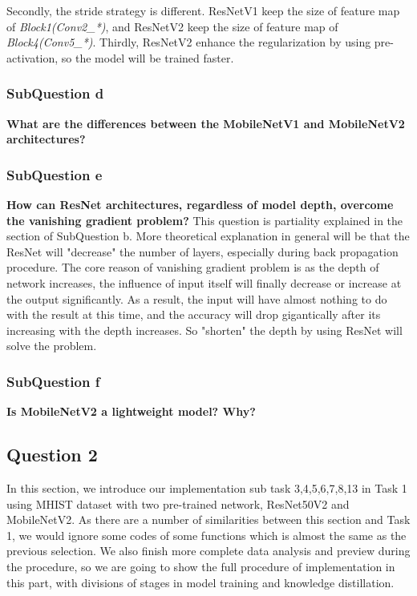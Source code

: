 \documentclass[conference]{IEEEtran}
\begin{document}
Secondly, the stride strategy is different. ResNetV1 keep the size of feature map of \textit{Block1(Conv2_*)}, and ResNetV2 keep the size of feature map of \textit{Block4(Conv5_*)}. Thirdly, ResNetV2 enhance the regularization by using pre-activation, so the model will be trained faster.

\subsubsection{SubQuestion d} \textbf{What are the differences between the MobileNetV1 and MobileNetV2 architectures?}

\subsubsection{SubQuestion e} \textbf{How can ResNet architectures, regardless of model depth, overcome the vanishing gradient problem?}
This question is partiality explained in the section of SubQuestion b. More theoretical explanation in general will be that the ResNet will "decrease" the number of layers, especially during back propagation procedure. The core reason of vanishing gradient problem is as the depth of network increases, the influence of input itself will finally decrease or increase at the output significantly. As a result, the input will have almost nothing to do with the result at this time, and the accuracy will drop gigantically after its increasing with the depth increases. So "shorten" the depth by using ResNet will solve the problem.

\subsubsection{SubQuestion f} \textbf{Is MobileNetV2 a lightweight model? Why?}

\subsection{Question 2} In this section, we introduce our implementation sub task 3,4,5,6,7,8,13 in Task 1 using MHIST dataset with two pre-trained network, ResNet50V2 and MobileNetV2. As there are a number of similarities between this section and Task 1, we would ignore some codes of some functions which is almost the same as the previous selection. We also finish more complete data analysis and preview during the procedure, so we are going to show the full procedure of implementation in this part, with divisions of stages in model training and knowledge distillation.
\end{document}
